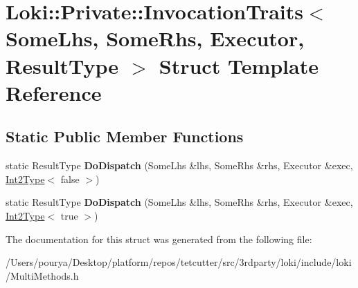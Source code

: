\hypertarget{structLoki_1_1Private_1_1InvocationTraits}{}\section{Loki\+:\+:Private\+:\+:Invocation\+Traits$<$ Some\+Lhs, Some\+Rhs, Executor, Result\+Type $>$ Struct Template Reference}
\label{structLoki_1_1Private_1_1InvocationTraits}
\subsection*{Static Public Member Functions}
\begin{DoxyCompactItemize}
\item 
\hypertarget{structLoki_1_1Private_1_1InvocationTraits_a60776579cf3f2cdaa3373de35b3bc76f}{}static Result\+Type {\bfseries Do\+Dispatch} (Some\+Lhs \&lhs, Some\+Rhs \&rhs, Executor \&exec, \hyperlink{structLoki_1_1Int2Type}{Int2\+Type}$<$ false $>$)\label{structLoki_1_1Private_1_1InvocationTraits_a60776579cf3f2cdaa3373de35b3bc76f}

\item 
\hypertarget{structLoki_1_1Private_1_1InvocationTraits_a4f9021b62980483e398df9ca3fe31817}{}static Result\+Type {\bfseries Do\+Dispatch} (Some\+Lhs \&lhs, Some\+Rhs \&rhs, Executor \&exec, \hyperlink{structLoki_1_1Int2Type}{Int2\+Type}$<$ true $>$)\label{structLoki_1_1Private_1_1InvocationTraits_a4f9021b62980483e398df9ca3fe31817}

\end{DoxyCompactItemize}


The documentation for this struct was generated from the following file\+:\begin{DoxyCompactItemize}
\item 
/\+Users/pourya/\+Desktop/platform/repos/tetcutter/src/3rdparty/loki/include/loki/Multi\+Methods.\+h\end{DoxyCompactItemize}
